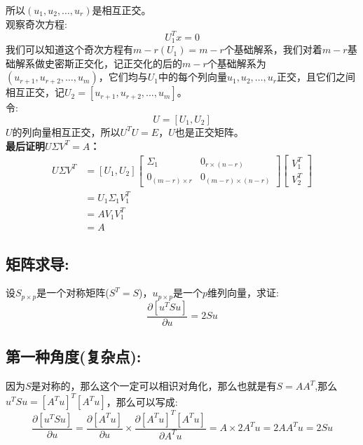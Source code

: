 \documentclass[withoutpreface,bwprint]{cumcmthesis} %
\begin{document}
	所以$(u_1,u_2,\ldots,u_r)$是相互正交。\\
	观察奇次方程:
	\begin{equation}
		U_1^Tx=0
	\end{equation}
	我们可以知道这个奇次方程有$m-r(U_1)=m-r$个基础解系，我们对着$m-r$基础解系做史密斯正交化，记正交化的后的$m-r$个基础解系为$(u_{r+1},u_{r+2},\ldots,u_{m})$，它们均与$U_1$中的每个列向量$u_1,u_2,\ldots,u_r$正交，且它们之间相互正交，记$U_2=\left[ u_{r+1},u_{r+2},\ldots,u_{m} \right]$。
	\\令:
	\begin{equation}
		U=\left[ U_1,U_2\right]
	\end{equation}
	$U$的列向量相互正交，所以$U^TU=E$，$U$也是正交矩阵。\\
	\textbf{最后证明$U \Sigma V^T=A$：}
	\begin{align*}
		U \Sigma V^T & = \left[ U_1,U_2\right] \left[
					\begin{array}{cc}
						\Sigma_1  & 0_{r \times (n-r)} \\
						0_{(m-r) \times r} & 0_{(m-r) \times (n-r)}
					\end{array}
					\right] \left[
						\begin{array}{c}
							V_1^T\\
							V_2^T
						\end{array}
					\right]\\
					&=U_1 \Sigma_1 V_1^T\\
					&=AV_1V_1^T\\
					&=A
	\end{align*}
	


	\subsection{矩阵求导:}
设$S_{p \times p}$是一个对称矩阵($S^T=S$)，$u_{p \times p}$是一个$p$维列向量，求证:
\begin{equation}
	\frac{\partial \left[u^T S u\right]}{\partial u}=2Su
\end{equation}
\subsection{第一种角度(复杂点):}
	因为$S$是对称的，那么这个一定可以相识对角化，那么也就是有$S=AA^T$,那么$u^T S u=\left[ A^Tu \right]^T \left[ A^Tu \right]$，那么可以写成:
	\begin{equation}
		\frac{\partial \left[u^T S u\right]}{\partial u}=\frac{\partial \left[A^Tu\right]}{\partial u} 
		 \times 
		 \frac{\partial \left[ A^Tu \right]^T \left[ A^Tu \right] }{\partial A^Tu} =A\times 2A^Tu=2AA^Tu=2Su
	\end{equation}
\end{document}
